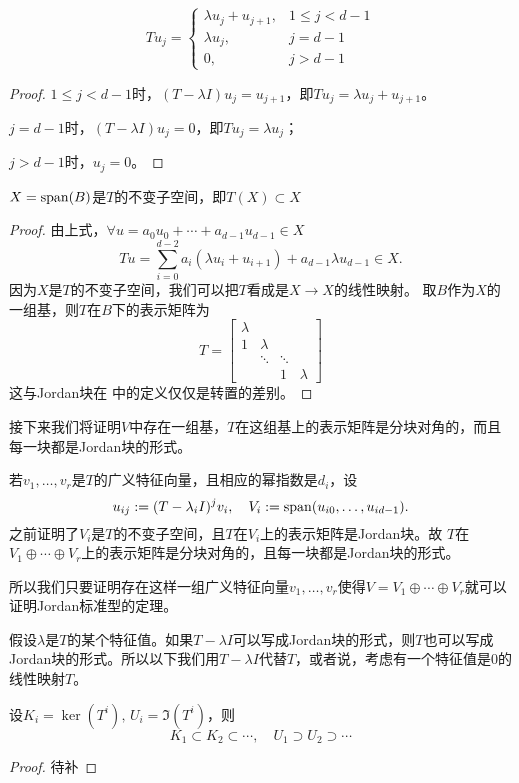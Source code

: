 \begin{theorem}{}{}
	\[
		Tu_j=\begin{cases}
			\lambda u_j+u_{j+1},&1\leqslant j<d-1\\
			\lambda u_j,&j=d-1\\
			0,&j>d-1
		\end{cases}
	\]
\end{theorem}
\begin{proof}
	$1\leqslant j<d-1$时，$(T-\lambda I)u_j=u_{j+1}$，即$Tu_j=\lambda u_j+u_{j+1}$。
	
	$j=d-1$时，$(T-\lambda I)u_j=0$，即$Tu_j=\lambda u_j$；
	
	$j>d-1$时，$u_j=0$。
\end{proof}
\begin{theorem}{}{}
	$X=\operatorname{span}(B)$是$T$的不变子空间，即$T(X)\subset X$
\end{theorem}
\begin{proof}
	由上式，$\forall u=a_0u_0+\cdots+a_{d-1}u_{d-1}\in X$
	\[
		Tu=\sum_{i=0}^{d-2}a_i(\lambda u_i+u_{i+1})+a_{d-1}\lambda u_{d-1}\in X.
	\]
	因为$X$是$T$的不变子空间，我们可以把$T$看成是$X\to X$的线性映射。
	取$B$作为$X$的一组基，则$T$在$B$下的表示矩阵为
	\[
		T=\begin{bmatrix}
			\lambda\\ 1&\lambda\\ &\ddots&\ddots\\ &&1&\lambda
		\end{bmatrix}
	\]
	这与Jordan块在 中的定义仅仅是转置的差别。
\end{proof}

接下来我们将证明$V$中存在一组基，$T$在这组基上的表示矩阵是分块对角的，而且每一块都是Jordan块的形式。
\begin{theorem}{}{}
	若$v_1,\ldots,v_r$是$T$的广义特征向量，且相应的幂指数是$d_i$，设 
	\[
		u_{ij}:=(T-\lambda_iI)^jv_i,\quad V_i:=\operatorname{span}(u_{i0},\ldots,u_{id-1}).
	\]
	之前证明了$V_i$是$T$的不变子空间，且$T$在$V_i$上的表示矩阵是Jordan块。故
	$T$在$V_1\oplus\cdots\oplus V_r$上的表示矩阵是分块对角的，且每一块都是Jordan块的形式。
\end{theorem}
所以我们只要证明存在这样一组广义特征向量$v_1,\ldots,v_r$使得$V=V_1\oplus\cdots\oplus V_r$就可以证明Jordan标准型的定理。

假设$\lambda$是$T$的某个特征值。如果$T-\lambda I$可以写成Jordan块的形式，则$T$也可以写成Jordan块的形式。所以以下我们用$T-\lambda I$代替$T$，或者说，考虑有一个特征值是0的线性映射$T$。
\begin{theorem}{}{}
	设$K_i=\ker(T^i),\,U_i=\Im(T^i)$，则
	\[
		K_1\subset K_2\subset\cdots,\quad U_1\supset U_2\supset\cdots
	\]
\end{theorem}
\begin{proof}
	待补
\end{proof} 

